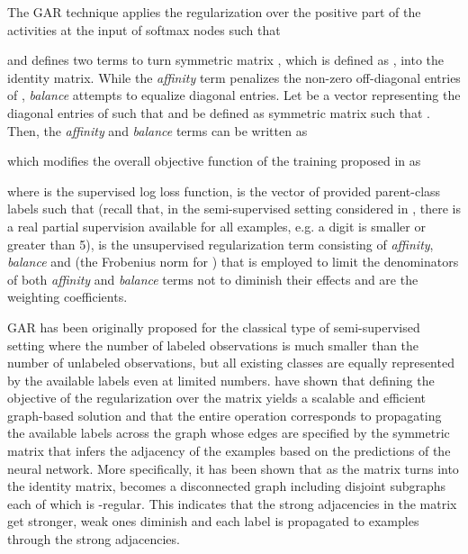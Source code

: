 \documentclass{article} \usepackage{iclr2018_conference,times}
\begin{document}
The GAR technique applies the regularization over the positive part of the activities at the input of softmax nodes such that 

and defines two terms to turn  symmetric matrix , which is defined as  , into the identity matrix. While the \textit{affinity} term penalizes the non-zero off-diagonal entries of , \textit{balance} attempts to equalize diagonal entries. Let  be a  vector representing the diagonal entries of  such that  and  be defined as  symmetric matrix such that . Then, the \textit{affinity} and \textit{balance} terms can be written as

\begin{minipage}{0.5\linewidth}
	
\end{minipage}\begin{minipage}{0.5\linewidth}
	
\end{minipage}

which modifies the overall objective function of the training proposed in \citet{KilincU17ACOL} as

where  is the supervised log loss function,  is the vector of provided parent-class labels such that  (recall that, in the semi-supervised setting considered in \citet{KilincU17ACOL}, there is a real partial supervision available for all examples, e.g. a digit is smaller or greater than 5),  is the unsupervised regularization term consisting of \textit{affinity}, \textit{balance} and  (the Frobenius norm for ) that is employed to limit the denominators of both \textit{affinity} and \textit{balance} terms not to diminish their effects and  are the weighting coefficients. 

GAR has been originally proposed for the classical type of semi-supervised setting where the number of labeled observations is much smaller than the number of unlabeled observations, but all existing classes are equally represented by the available labels even at limited numbers. \citet{KilincU17GAR} have shown that defining the objective of the regularization over the matrix  yields a scalable and efficient graph-based solution and that the entire operation corresponds to propagating the available labels across the graph  whose edges are specified by the  symmetric matrix  that infers the adjacency of the examples based on the predictions of the neural network. More specifically, it has been shown that as the matrix  turns into the identity matrix,  becomes a disconnected graph including  disjoint subgraphs each of which is -regular. This indicates that the strong adjacencies in the matrix  get stronger, weak ones diminish and each label is propagated to  examples through the strong adjacencies. 
\end{document}
